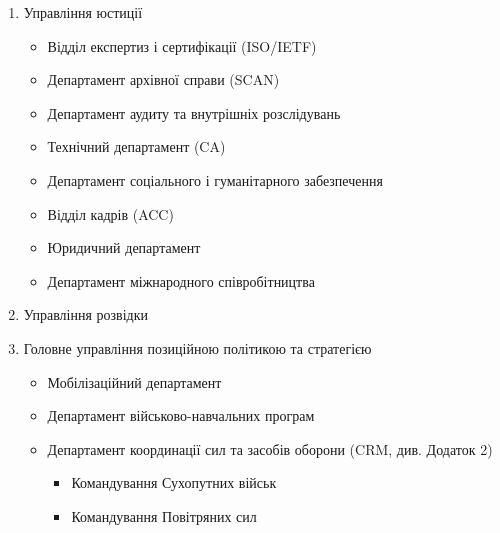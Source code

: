 \begin{enumerate}
\begin{itemize}
\begin{itemize}
        \end{itemize}
        \item Департамент авіації, авіоніки, аеронавтики та безпілотних літальних апаратів (БПЛА) і їхніх систем
        \begin{itemize}
            \item Відділ авіації
            \item Відділ авіоніки
            \item Відділ аеронавтики
            \item Відділ безпілотних систем
        \end{itemize}
        \item Департамент машинобудування (тестування і проектування місцевості, SolidWorks)
        \item Департамент суднобудування та військово-морської техніки
    \end{itemize}
    \item Управління юстиції
    \begin{itemize}
        \item Відділ експертиз і сертифікації (ISO/IETF)
        \item Департамент архівної справи (SCAN)
        \item Департамент аудиту та внутрішніх розслідувань
        \item Технічний департамент (CA)
        \item Департамент соціального і гуманітарного забезпечення
        \item Відділ кадрів (ACC)
        \item Юридичний департамент
        \item Департамент міжнародного співробітництва
    \end{itemize}
    \item Управління розвідки
    \item Головне управління позиційною політикою та стратегією
    \begin{itemize}
        \item Мобілізаційний департамент
        \item Департамент військово-навчальних програм
        \item Департамент координації сил та засобів оборони (CRM, див. Додаток 2)
        \begin{itemize}
            \item Командування Сухопутних військ
            \item Командування Повітряних сил

\end{itemize}
\end{itemize}
\end{enumerate}
